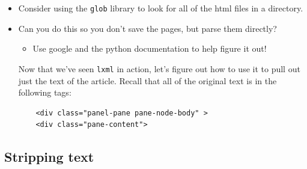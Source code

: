 \documentclass[11pt]{article}
\begin{document}
\begin{itemize}
\item Consider using the \texttt{glob} library to look for all of the html files in a directory.
\item Can you do this so you don't save the pages, but parse them directly?
\begin{itemize}
\item Use google and the python documentation to help figure it out!
\end{itemize}
Now that we've seen \texttt{lxml} in action, let's figure out how to use
   it to pull out just the text of the article.  Recall that
   all of the original text is in the following tags:
   
\begin{verbatim}
    <div class="panel-pane pane-node-body" >    
    <div class="pane-content">
\end{verbatim}
\end{itemize}
     
\subsection{Stripping text}
\label{sec-5-4}
\end{document}
